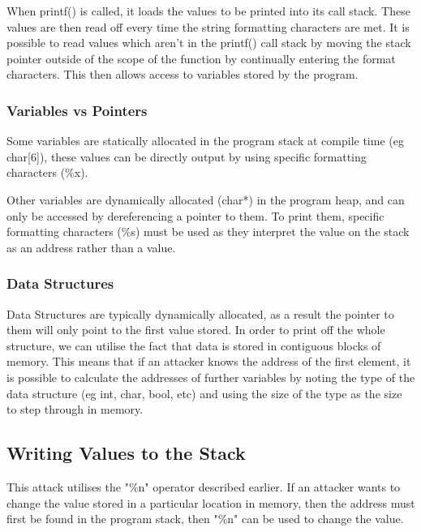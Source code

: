 \documentclass[11pt]{article}
\begin{document}
When printf() is called, it loads the values to be printed into its
call stack. These values are then read off every time the string
formatting characters are met. It is possible to read values which
aren't in the printf() call stack by moving the stack pointer outside
of the scope of the function by continually entering the format
characters. This then allows access to variables stored by the
program.

\subsubsection{Variables vs Pointers}
\label{sec:org66c4b54}

Some variables are statically allocated in the program stack at
compile time (eg char[6]), these values can be directly
output by using specific formatting characters (\%x).

Other variables are dynamically allocated (char*) in the program heap, and
can only be accessed by dereferencing a pointer to them. To print
them, specific formatting characters (\%s) must be used as they interpret
the value on the stack as an address rather than a value.

\subsubsection{Data Structures}
\label{sec:orga0f0116}

Data Structures are typically dynamically allocated, as a result the
pointer to them will only point to the first value stored. In order to
print off the whole structure, we can utilise the fact that data is
stored in contiguous blocks of memory. This means that if an attacker
knows the address of the first element, it is possible to calculate
the addresses of further variables by noting the type of the data
structure (eg int, char, bool, etc) and using the size of the type as
the size to step through in memory.

\subsection{Writing Values to the Stack}
\label{sec:org0988e51}

This attack utilises the "\%n" operator described earlier. If an
attacker wants to change the value stored in a particular location in
memory, then the address must first be found in the program stack,
then "\%n" can be used to change the value.
\end{document}

